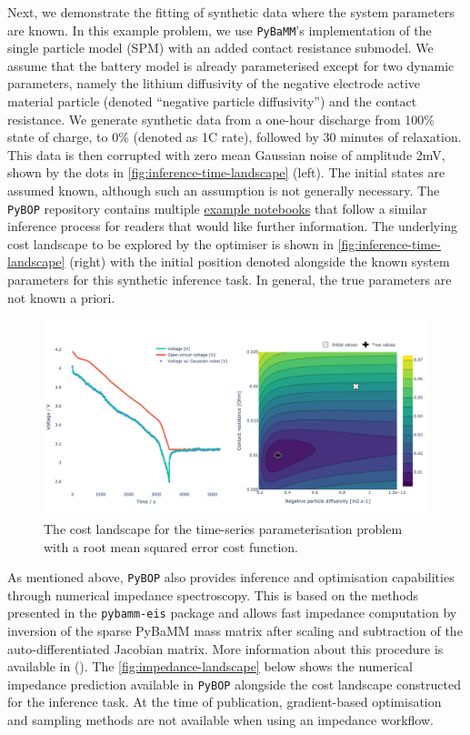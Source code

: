 \documentclass[
]{article}
\begin{document}
Next, we demonstrate the fitting of synthetic data where the system
parameters are known. In this example problem, we use \texttt{PyBaMM}'s
implementation of the single particle model (SPM) with an added contact
resistance submodel. We assume that the battery model is already
parameterised except for two dynamic parameters, namely the lithium
diffusivity of the negative electrode active material particle (denoted
``negative particle diffusivity'') and the contact resistance. We
generate synthetic data from a one-hour discharge from 100\% state of
charge, to 0\% (denoted as 1C rate), followed by 30 minutes of
relaxation. This data is then corrupted with zero mean Gaussian noise of
amplitude 2mV, shown by the dots in
\autoref{fig:inference-time-landscape} (left). The initial states are
assumed known, although such an assumption is not generally necessary.
The \texttt{PyBOP} repository contains multiple
\href{https://github.com/pybop-team/PyBOP/tree/develop/examples/notebooks}{example
notebooks} that follow a similar inference process for readers that
would like further information. The underlying cost landscape to be
explored by the optimiser is shown in
\autoref{fig:inference-time-landscape} (right) with the initial position
denoted alongside the known system parameters for this synthetic
inference task. In general, the true parameters are not known a priori.

\begin{figure}
\centering
\includegraphics[width=1\textwidth,height=\textheight]{figures/joss/sim-landscape.png}
\caption{The cost landscape for the time-series parameterisation problem
with a root mean squared error cost function.
\label{fig:inference-time-landscape}}
\end{figure}

As mentioned above, \texttt{PyBOP} also provides inference and
optimisation capabilities through numerical impedance spectroscopy. This
is based on the methods presented in the \texttt{pybamm-eis} package and
allows fast impedance computation by inversion of the sparse PyBaMM mass
matrix after scaling and subtraction of the auto-differentiated Jacobian
matrix. More information about this procedure is available in
(). The
\autoref{fig:impedance-landscape} below shows the numerical impedance
prediction available in \texttt{PyBOP} alongside the cost landscape
constructed for the inference task. At the time of publication,
gradient-based optimisation and sampling methods are not available when
using an impedance workflow.
\end{document}
